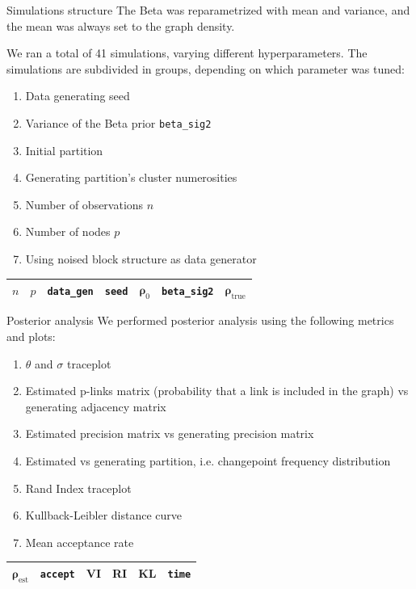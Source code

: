 \begin{frame}{Simulations structure}
The Beta was reparametrized with mean and variance, and the mean was always set to the graph density.

We ran a total of 41 simulations, varying different hyperparameters. 
The simulations are subdivided in groups, depending on which parameter was tuned:
    \begin{enumerate}
        \item Data generating \alert{seed}
        \item Variance of the Beta prior \texttt{beta\_sig2}
        \item Initial partition
        \item Generating partition's \alert{cluster numerosities}
        \item Number of \alert{observations} $n$
        \item Number of \alert{nodes} $p$
        \item Using \alert{noised} block structure as data generator
    \end{enumerate}

\begin{table}[H]
\centering
\begin{tabular}{lllllll}
\cmidrule(l{3pt}r{3pt}){1-7} 
$n$ & $p$ & \texttt{data\_gen} & \texttt{seed} & $\bm{\rho}_0$ & \texttt{beta\_sig2} & $\bm{\rho}_{\text{true}}$ \\
\midrule
\end{tabular}
\end{table}
\end{frame}


\begin{frame}{Posterior analysis}
We performed posterior analysis using the following metrics and plots:
    \begin{enumerate}
        \item $\theta$ and $\sigma$ traceplot
        \item Estimated \alert{p-links} matrix (probability that a link is included in the graph) vs generating adjacency matrix
        \item Estimated \alert{precision matrix} vs generating precision matrix
        \item Estimated vs generating partition, i.e. \alert{changepoint frequency} distribution
        \item Rand Index traceplot
        \item \alert{Kullback-Leibler} distance curve
        \item Mean acceptance rate
    \end{enumerate}

\begin{table}[H]
\centering
\begin{tabular}{llllll}
\cmidrule(l{3pt}r{3pt}){1-6} 
$\bm{\rho}_{\text{est}}$ & \texttt{accept} & VI & RI & KL & \texttt{time}\\
\midrule
\end{tabular}
\end{table}
\end{frame}


